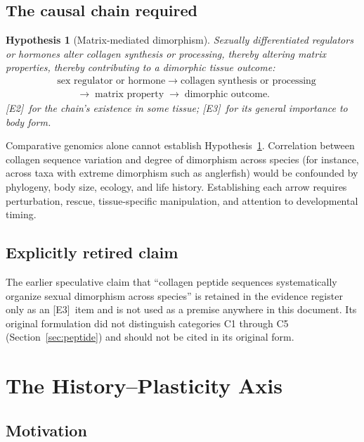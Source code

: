 \documentclass[11pt,a4paper]{article}
\theoremstyle{plain}
\newtheorem{hypothesis}{Hypothesis}[section]
\theoremstyle{definition}
\theoremstyle{remark}
\newcommand{\tier}[1]{\textup{\textsc{[#1]}}}
\newcommand{\Etwo}{\tier{E2}}
\newcommand{\Ethree}{\tier{E3}}
\begin{document}
\subsection{The causal chain required}

\begin{hypothesis}[Matrix-mediated dimorphism]\label{hyp:dimorphism}
Sexually differentiated regulators or hormones alter collagen synthesis or processing, thereby altering matrix properties, thereby contributing to a dimorphic tissue outcome:
\begin{align*}
&\text{sex regulator or hormone}\;\to\;\text{collagen synthesis or processing}\\
&\qquad\to\;\text{matrix property}\;\to\;\text{dimorphic outcome}.
\end{align*}
\Etwo\ for the chain's existence in some tissue; \Ethree\ for its general importance to body form.
\end{hypothesis}

\begin{caution}
Comparative genomics alone cannot establish Hypothesis~\ref{hyp:dimorphism}. Correlation between collagen sequence variation and degree of dimorphism across species (for instance, across taxa with extreme dimorphism such as anglerfish) would be confounded by phylogeny, body size, ecology, and life history. Establishing each arrow requires perturbation, rescue, tissue-specific manipulation, and attention to developmental timing.
\end{caution}

\subsection{Explicitly retired claim}

The earlier speculative claim that ``collagen peptide sequences systematically organize sexual dimorphism across species'' is retained in the evidence register only as an \Ethree\ item and is not used as a premise anywhere in this document. Its original formulation did not distinguish categories C1 through C5 (Section~\ref{sec:peptide}) and should not be cited in its original form.

\section{The History--Plasticity Axis}\label{sec:axis}

\subsection{Motivation}
\end{document}
